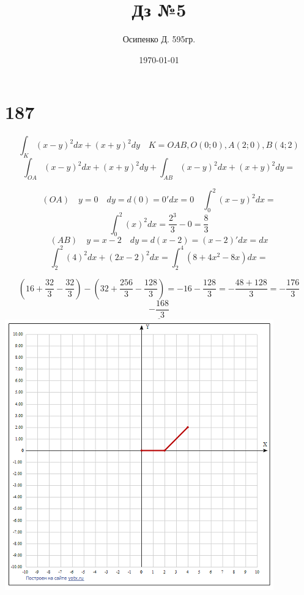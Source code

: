 \documentclass[a4paper, 12pt]{article}
\title{Дз №5}
\author{Осипенко Д. 595гр.}
\date{\today}
\begin{document}
\sffamily
\maketitle
\section*{187}
\[
	\int_K(x-y)^2 dx + (x+y)^2dy \quad K=OAB,O(0;0),A(2;0),B(4;2)
\]
\[
	\int_{OA}(x-y)^2 dx + (x+y)^2dy + \int_{AB}(x-y)^2 dx + (x+y)^2dy = 
\]

\[
	(OA) \quad y = 0 \quad dy=d(0) = 0'dx =0\quad\int_{0}^2(x-y)^2dx = 
\]
\[
	\int_{0}^2(x)^2 dx = \frac{2^3}{3}- 0 = \frac{8}{3}
\]
\[
	(AB) \quad y = x-2 \quad dy=d(x-2) = (x-2)'dx = dx 
\]
\[
	\int_{2}^2(4)^2 dx + (2x-2)^2dx = \int_{2}^4(8 + 4x^2 - 8x)dx = 
\]

\[
	(16 + \frac{32}{3} - \frac{32}{3})-(32 + \frac{256}{3} - \frac{128}{3}) = -16 - \frac{128}{3} = -\frac{48+128}{3}=-\frac{176}{3}
\]
\[
	\underline{-\frac{168}{3}}
\]
\includegraphics{yotx.png}
\end{document}
